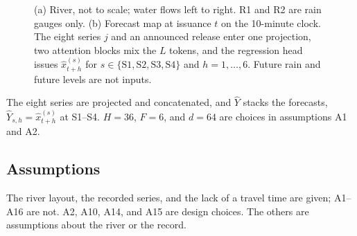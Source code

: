 \documentclass[11pt,a4paper]{article}
\begin{document}
\begin{figure}[H]
\caption*{(a) River, not to scale; water flows left to right. R1 and R2 are rain gauges only. (b) Forecast map at issuance \(t\) on the 10-minute clock. The eight series \(j\) and an announced release enter one projection, two attention blocks mix the \(L\) tokens, and the regression head issues \(\hat x^{(s)}_{t+h}\) for \(s\in\{\mathrm{S1},\mathrm{S2},\mathrm{S3},\mathrm{S4}\}\) and \(h=1,\ldots,6\). Future rain and future levels are not inputs.}
\end{figure}

The eight series are projected and concatenated, and $\hat Y$ stacks the forecasts, $\hat Y_{s,h}=\hat x^{(s)}_{t+h}$ at S1--S4. $H=36$, $F=6$, and $d=64$ are choices in assumptions A1 and A2.

\subsection{Assumptions}

The river layout, the recorded series, and the lack of a travel time are given; A1--A16 are not. A2, A10, A14, and A15 are design choices. The others are assumptions about the river or the record.
\end{document}
